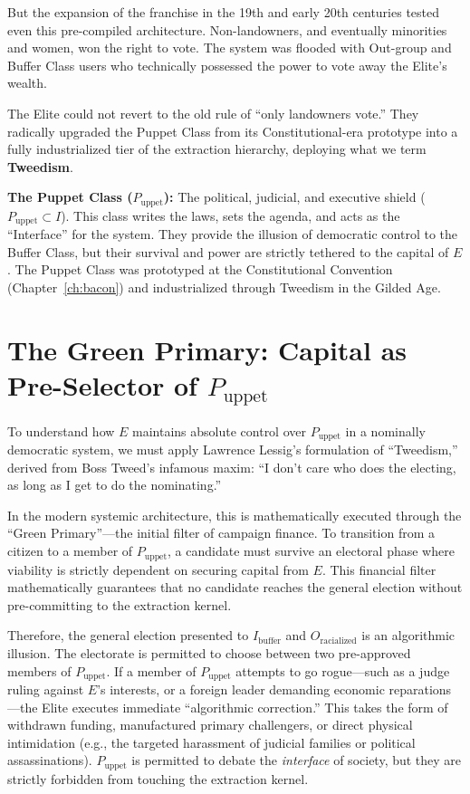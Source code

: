 But the expansion of the franchise in the 19th and early 20th centuries tested even this pre-compiled architecture. Non-landowners, and eventually minorities and women, won the right to vote. The system was flooded with Out-group and Buffer Class users who technically possessed the power to vote away the Elite's wealth.

The Elite could not revert to the old rule of ``only landowners vote.'' They radically upgraded the Puppet Class from its Constitutional-era prototype into a fully industrialized tier of the extraction hierarchy, deploying what we term \textbf{Tweedism}.

\begin{definition}
\textbf{The Puppet Class ($P_{\text{uppet}}$):} The political, judicial, and executive shield ($P_{\text{uppet}} \subset I$). This class writes the laws, sets the agenda, and acts as the ``Interface'' for the system. They provide the illusion of democratic control to the Buffer Class, but their survival and power are strictly tethered to the capital of $E$. The Puppet Class was prototyped at the Constitutional Convention (Chapter~\ref{ch:bacon}) and industrialized through Tweedism in the Gilded Age.
\end{definition}

\section{The Green Primary: Capital as Pre-Selector of \texorpdfstring{$P_{\text{uppet}}$}{P\_uppet}}
\label{sec:tweedism-filter}

To understand how $E$ maintains absolute control over $P_{\text{uppet}}$ in a nominally democratic system, we must apply Lawrence Lessig's formulation of ``Tweedism,'' derived from Boss Tweed's infamous maxim: ``I don't care who does the electing, as long as I get to do the nominating.''

In the modern systemic architecture, this is mathematically executed through the ``Green Primary''---the initial filter of campaign finance. To transition from a citizen to a member of $P_{\text{uppet}}$, a candidate must survive an electoral phase where viability is strictly dependent on securing capital from $E$. This financial filter mathematically guarantees that no candidate reaches the general election without pre-committing to the extraction kernel.

Therefore, the general election presented to $I_{\text{buffer}}$ and $O_{\text{racialized}}$ is an algorithmic illusion. The electorate is permitted to choose between two pre-approved members of $P_{\text{uppet}}$. If a member of $P_{\text{uppet}}$ attempts to go rogue---such as a judge ruling against $E$'s interests, or a foreign leader demanding economic reparations---the Elite executes immediate ``algorithmic correction.'' This takes the form of withdrawn funding, manufactured primary challengers, or direct physical intimidation (e.g., the targeted harassment of judicial families or political assassinations). $P_{\text{uppet}}$ is permitted to debate the \textit{interface} of society, but they are strictly forbidden from touching the extraction kernel.

